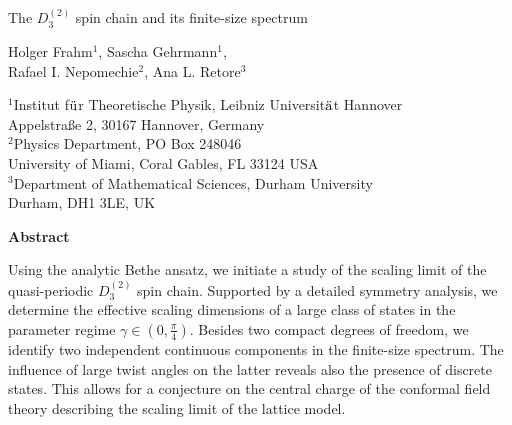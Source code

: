 \documentclass[12pt]{article}
\numberwithin{equation}{section}
\begin{document}


\begin{titlepage}
$\phantom{I}$
\vspace{2.8cm}

\begin{center}
\begin{LARGE}


{The $D^{(2)}_{3}$ spin chain and its finite-size spectrum}
\end{LARGE}
\vspace{1.3cm}
\begin{large}
{\bf 

Holger Frahm$^1$, Sascha Gehrmann$^1$,\\ Rafael I. Nepomechie$^2$, Ana L. Retore$^3$}

\end{large}

\vspace{1.cm}
$^1$Institut f$\ddot{{\rm u}}$r Theoretische Physik, 
Leibniz Universit$\ddot{{\rm a}}$t Hannover\\
Appelstra\ss e 2, 30167 Hannover, Germany\\\vspace{0.5cm}
$^2$Physics Department, PO Box 248046\\
University of Miami, Coral Gables, FL 33124 USA\\ \vspace{0.5cm}
$^3$Department of Mathematical Sciences, Durham University\\ Durham, DH1 3LE, UK


\vspace{1.0cm}

\end{center}

\begin{center}

\parbox{13cm}{%
\centerline{\bf Abstract} \vspace{.8cm}
Using the analytic Bethe ansatz, we initiate a study of the scaling limit of the quasi-periodic $D^{(2)}_3$ spin chain. Supported by a detailed symmetry analysis, we determine the effective scaling dimensions of a large class of states in the parameter regime $\gamma\in (0,\frac{\pi}{4})$. Besides two compact degrees of freedom, we identify two independent continuous components in the finite-size spectrum. The influence of large twist angles on the latter reveals also the presence of discrete states. This allows for a conjecture on the central charge of the conformal field theory describing the scaling limit of the lattice model.}

\end{center}

\vfill

\end{titlepage}
\end{document}
